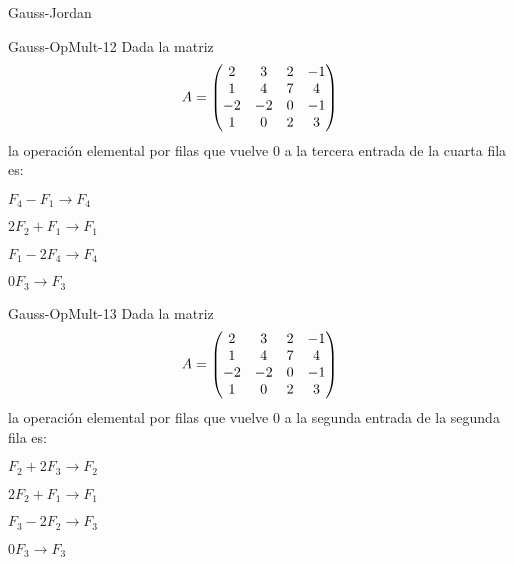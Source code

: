 \documentclass[a4,11pt]{aleph-notas}
\begin{document}
\begin{quiz}{Gauss-Jordan}
\begin{multi}{Gauss-OpMult-12}
    Dada la matriz
    \[
        A= \begin{pmatrix} 2 & 3 & 2 & -1 \cr 1 & 4 & 7 & 4  \cr -2 & -2 & 0 & -1 \cr 1 & 0 & 2 & 3\end{pmatrix} 
    \] la operación elemental por filas que vuelve $0$ a la tercera entrada de la cuarta fila es:
    \item* $F_4-F_1\to F_4$
    \item $2F_2+F_1\to F_1$
    \item $F_1-2F_4\to F_4$
    \item $0F_3\to F_3$
\end{multi}

\begin{multi}{Gauss-OpMult-13}
    Dada la matriz
    \[
        A= \begin{pmatrix} 2 & 3 & 2 & -1 \cr 1 & 4 & 7 & 4  \cr -2 & -2 & 0 & -1 \cr 1 & 0 & 2 & 3\end{pmatrix} 
    \] 
    la operación elemental por filas que vuelve $0$ a la segunda entrada de la segunda fila es:
    \item* $F_2+2F_3\to F_2$
    \item $2F_2+F_1\to F_1$
    \item $F_3-2F_2\to F_3$
    \item $0F_3\to F_3$
\end{multi}

\end{quiz}
\end{document}
